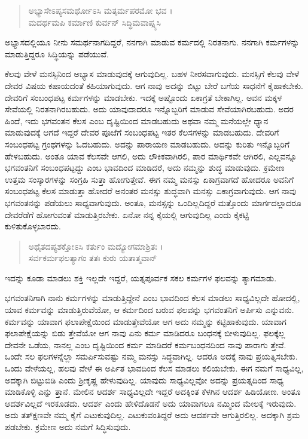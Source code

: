 \begin{verse}
ಅಭ್ಯಾಸೇಽಪ್ಯಸಮರ್ಥೋಽಸಿ ಮತ್ಕರ್ಮಪರಮೋ ಭವ ।\\ಮದರ್ಥಮಪಿ ಕರ್ಮಾಣಿ ಕುರ್ವನ್ ಸಿದ್ಧಿಮವಾಪ್ಸ್ಯಸಿ 
\end{verse}

{\small ಅಭ್ಯಾಸದಲ್ಲಿಯೂ ನೀನು ಸಮರ್ಥನಾಗದಿದ್ದರೆ, ನನಗಾಗಿ ಮಾಡುವ ಕರ್ಮದಲ್ಲಿ ನಿರತನಾಗು. ನನಗಾಗಿ ಕರ್ಮಗಳನ್ನು ಮಾಡುತ್ತಿದ್ದರೂ ಸಿದ್ಧಿಯನ್ನು ಪಡೆಯುವೆ.}

ಕೆಲವು ವೇಳೆ ಮನಸ್ಸಿನಿಂದ ಅಭ್ಯಾಸ ಮಾಡುವುದಕ್ಕೆ ಆಗುವುದಿಲ್ಲ. ಬಹಳ ನೀರಸವಾಗುವುದು. ಮನಸ್ಸಿಗೆ ಕೆಲವು ವೇಳೆ ದೇವರ ವಿಷಯ ಕಷಾಯದಂತೆ ಕಹಿಯಾಗುವುದು. ಆಗ ನಾವು ಅದನ್ನು ಬಿಟ್ಟು ಬೇರೆ ಬಗೆಯ ಸಾಧನೆಗೆ ಕೈಹಾಕಬೇಕು. ದೇವರಿಗೆ ಸಂಬಂಧಪಟ್ಟ ಕರ್ಮಗಳನ್ನು ಮಾಡಬೇಕು. ಇದಕ್ಕೆ ಅಷ್ಟೊಂದು ಏಕಾಗ್ರತೆ ಬೇಕಾಗಿಲ್ಲ. ಅವನ ಮಕ್ಕಳ ಸೇವೆಯಲ್ಲಿ ನಿರತನಾಗಿರಬಹುದು. ಅದು ಯಾವುದಾದರೂ ಇನ್ನೊಬ್ಬರಿಗೆ ಮಾಡುವ ಸೇವೆಯಾಗಿರಬಹುದು. ಅದರ ಹಿಂದೆ, ಇದು ಭಗವಂತನ ಕೆಲಸ ಎಂಬ ದೃಷ್ಟಿಯಿಂದ ಮಾಡಬಹುದು ಅಥವಾ ನಮ್ಮ ಮನೆಯಲ್ಲೇ ಧ್ಯಾನ ಮಾಡುವುದಕ್ಕೆ ಆಗದೆ ಇದ್ದರೆ ದೇವರ ಪೂಜೆಗೆ ಸಂಬಂಧಪಟ್ಟ ಇತರ ಕೆಲಸಗಳನ್ನು ಮಾಡಬಹುದು. ದೇವರಿಗೆ ಸಂಬಂಧಪಟ್ಟ ಗ್ರಂಥಗಳನ್ನು ಓದಬಹುದು. ಅದನ್ನು ಪಾರಾಯಣ ಮಾಡಬಹುದು. ಅದನ್ನು ಕುರಿತು ಇನ್ನೊಬ್ಬರಿಗೆ ಹೇಳಬಹುದು. ಅಂತೂ ಯಾವ ಕೆಲಸವೇ ಆಗಲಿ, ಅದು ಲೌಕಿಕವಾಗಿರಲಿ, ಪಾರ ಮಾರ್ಥಿಕವೇ ಆಗಿರಲಿ, ಎಲ್ಲವನ್ನೂ ಭಗವಂತನಿಗೆ ಸಂಬಂಧಪಟ್ಟದ್ದು ಎಂಬ ಭಾವದಿಂದ ಮಾಡಿದರೆ, ಅದು ನಮ್ಮನ್ನು ಶುದ್ಧ ಮಾಡುವುದು. ಕ್ರಮೇಣ ಉತ್ತಮ ಸಂಸ್ಕಾರಗಳನ್ನು ಸಂಗ್ರಹಿ ಸುತ್ತಾ ಹೋಗುತ್ತೇವೆ. ಈಗ ನಮ್ಮ ಮನಸ್ಸು ಏಕಾಗ್ರವಾಗದೆ ಹೋದರೂ ಅವನಿಗೆ ಸಂಬಂಧಪಟ್ಟ ಕೆಲಸ ಮಾಡುತ್ತಾ ಹೋದರೆ ಅನಂತರ ಮನಸ್ಸು ಶುದ್ಧವಾಗಿ ಮನಸ್ಸು ಏಕಾಗ್ರವಾಗುವುದು. ಆಗ ನಾವು ಭಗವಂತನನ್ನು ಪಡೆಯಲು ಸಾಧ್ಯವಾಗುವುದು. ಅಂತೂ, ಮನಸ್ಸನ್ನು ಒಂದಿಲ್ಲದಿದ್ದರೆ ಮತ್ತೊಂದು ಮಾರ್ಗದಲ್ಲಾದರೂ ದೇವರೆಡೆಗೆ ಹೋಗುವಂತೆ ಮಾಡುತ್ತಿರಬೇಕು. ಏನೋ ನನ್ನ ಕೈಯಲ್ಲಿ ಆಗುವುದಿಲ್ಲ ಎಂದು ಕೈಕಟ್ಟಿ ಕುಳಿತುಕೊಳ್ಳಬಾರದು.

\begin{verse}
ಅಥೈತದಪ್ಯಶಕ್ತೋಽಸಿ ಕರ್ತುಂ ಮದ್ಯೋಗಮಾಶ್ರಿತಃ ।\\ಸರ್ವಕರ್ಮಫಲತ್ಯಾಗಂ ತತಃ ಕುರು ಯತಾತ್ಮವಾನ್ 
\end{verse}

{\small ಇದನ್ನು ಕೂಡಾ ಮಾಡಲು ಶಕ್ತಿ ಇಲ್ಲದೇ ಇದ್ದರೆ, ಯತ್ನಪೂರ್ವಕ ಸಕಲ ಕರ್ಮಗಳ ಫಲವನ್ನು ತ್ಯಾಗಮಾಡು.}

ಭಗವಂತನಿಗಾಗಿ ನಾನು ಕರ್ಮಗಳನ್ನು ಮಾಡುತ್ತಿದ್ದೇನೆ ಎಂಬ ಭಾವದಿಂದ ಕೆಲಸ ಮಾಡಲು ಸಾಧ್ಯವಿಲ್ಲದೇ ಹೋದಲ್ಲಿ, ಯಾವ ಕರ್ಮವನ್ನು ಮಾಡುತ್ತಿರುವೆಯೋ, ಆ ಕರ್ಮದಿಂದ ಬರುವ ಫಲವನ್ನು ಭಗವಂತನಿಗೆ ಅರ್ಪಿಸು ಎನ್ನುವನು. ಕರ್ಮವನ್ನು ಯಾವಾಗ ಫಲಾಪೇಕ್ಷೆಯಿಂದ ಮಾಡುತ್ತೇವೆಯೋ ಆಗ ಅದು ನಮ್ಮನ್ನು ಕಟ್ಟಿಹಾಕುವುದು. ಯಾವಾಗ ಫಲಾಪೇಕ್ಷೆಯನ್ನು ಬಿಡು ತ್ತೇವೆಯೋ ಆಗ ನಾವು ಏನು ಕರ್ಮ ಮಾಡಿದರೂ ಬಂಧನಕ್ಕೆ ಬೀಳುವುದಿಲ್ಲ. ಫಲಕ್ಕೆಲ್ಲ ದೇವನೇ ಒಡೆಯ, ನಾನಲ್ಲ ಎಂಬ ದೃಷ್ಟಿಯಿಂದ ಕರ್ಮ ಮಾಡಿದರೆ ಕರ್ಮಬಂಧನದಿಂದ ನಾವು ಪಾರಾಗು ತ್ತೇವೆ. ಒಂದೇ ಸಲ ಫಲಗಳನ್ನೆಲ್ಲಾ ಸಮರ್ಪಿಸುವಷ್ಟು ನಮ್ಮ ಮನಸ್ಸು ಸಿದ್ಧವಾಗಿಲ್ಲ. ಆದರೂ ಅದಕ್ಕೆ ನಾವು ಪ್ರಯತ್ನಿಸಬೇಕು. ಒಂದು ವೇಳೆಯಲ್ಲ, ಹಲವು ವೇಳೆ ಈ ಅರ್ಪಿತ ಭಾವದಿಂದ ಕೆಲಸ ಮಾಡಲು ಕಲಿಯಬೇಕು. ಈಗ ನಮಗೆ ಸಾಧ್ಯವಿಲ್ಲ, ಅದಕ್ಕಾಗಿ ಬಿಟ್ಟುಬಿಡಿ ಎಂದು ಶ್ರೀಕೃಷ್ಣ ಹೇಳುವುದಿಲ್ಲ. ಯಾವುದು ಸಾಧ್ಯವಿಲ್ಲವೋ ಅದನ್ನು ಪ್ರಯತ್ನದಿಂದ ಸಾಧ್ಯ ಮಾಡಿಕೊಳ್ಳಿ ಎನ್ನು ತ್ತಾನೆ. ಮೇಲಿನ ಆದರ್ಶ ಸಾಧ್ಯವಿಲ್ಲದೇ ಇದ್ದರೆ ಅದಕ್ಕಿಂತ ಕೆಳಗಿನ ಆದರ್ಶ ಹಿಡಿಯೋಣ. ಅಂತೂ ಆದರ್ಶವಿಲ್ಲದೆ ಇರಕೂಡದು. ಆದರ್ಶ ಎಂದು ಹೇಳಿದೊಡನೆ ಅದು ಯಾವಾಗಲೂ ನಮ್ಮಿಂದ ಮೇಲಕ್ಕೆ ಇರುವುದು. ಅದು ತತ್​ಕ್ಷಣವೇ ನಮ್ಮ ಕೈಗೆ ಎಟುಕುವುದಿಲ್ಲ. ಎಟುಕುವಂತಿದ್ದರೆ ಅದು ಆದರ್ಶವೇ ಆಗುತ್ತಿರಲಿಲ್ಲ. ಅದಕ್ಕಾಗಿ ಶ್ರಮ ಪಡಬೇಕು. ಕ್ರಮೇಣ ಅದು ನಮಗೆ ಸಿದ್ಧಿಸುವುದು.

